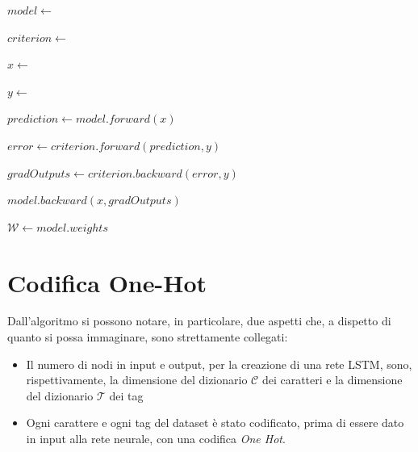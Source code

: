 \begin{algorithm}[ph] \label{alg:train}

  \BlankLine
  $model \gets $ 

  $criterion \gets $ \ClassNLLCriterion{}

   {
     {
      $x \gets $ 

      $y \gets $ 

      $prediction \gets model.forward(x)$

      $error \gets criterion.forward(prediction, y)$

      $gradOutputs \gets criterion.backward(error, y)$

      $model.backward(x, gradOutputs)$
    }
  }

  $\mathcal{W} \gets model.weights$

\caption{$Addestramento$}
\end{algorithm}

\section{Codifica One-Hot}
Dall'algoritmo si possono notare, in particolare, due aspetti che, a dispetto di
quanto si possa immaginare, sono strettamente collegati:

\begin{itemize}
  \item Il numero di nodi in input e output, per la creazione di una rete LSTM,
        sono, rispettivamente, la dimensione del dizionario $\mathcal{C}$ dei
        caratteri e la dimensione del dizionario $\mathcal{T}$ dei tag
  \item Ogni carattere e ogni tag del dataset \`e stato codificato, prima di essere
        dato in input alla rete neurale, con una codifica \emph{One Hot}.
\end{itemize}


